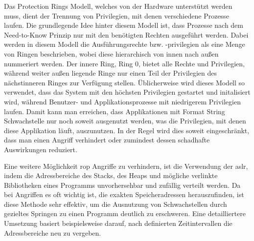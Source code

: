 \documentclass[a4paper,
DIV=13,
12pt,
BCOR=10mm,
department=FakIM,
oneside,
parskip=half,
automark,
listof=totocnumbered,
bibliography=totocnumbered,
acronym=totocnumbered
] {OTHRartcl}
\begin{document}
Das Protection Rings Modell, welches von der Hardware unterstützt werden muss, dient der Trennung von Privilegien, mit denen verschiedene Prozesse laufen.
Die grundlegende Idee hinter diesem Modell ist, dass Prozesse nach dem Need-to-Know Prinzip nur mit den benötigten Rechten ausgeführt werden.
Dabei werden in diesem Modell die Ausführungsrechte bzw. -privilegien
als eine Menge von Ringen beschrieben, wobei diese hierarchisch von innen nach außen nummeriert werden.
Der innere Ring, Ring 0, bietet alle Rechte und Privilegien, während weiter außen liegende Ringe nur einen Teil der Privilegien des nächstinneren Ringes zur Verfügung stellen.
Üblicherweise wird dieses Modell so verwendet, dass das System mit den höchsten Privilegien gestartet und initalisiert wird, während Benutzer- und Applikationsprozesse mit niedrigerem Privilegien
laufen. Damit kann man erreichen, dass Applikationen mit Format String Schwachstelle nur noch soweit ausgenutzt werden, was die Privilegien, mit denen diese Applikation läuft, auszunutzen.
In der Regel wird dies soweit eingeschränkt, dass man einen Angriff verhindert oder zumindest dessen schadhafte Auswirkungen reduziert.

Eine weitere Möglichkeit \ac{rop} Angriffe zu verhindern, ist die Verwendung der \ac{aslr}, indem die Adressbereiche des Stacks, des Heaps und mögliche verlinkte Bibliotheken eines Programms unvorhersehbar und zufällig verteilt werden.
Da bei Angriffen es oft wichtig ist, die exakten Speicheradressen herauszufinden, ist diese Methode sehr effektiv, um die Ausnutzung von Schwachstellen durch gezieltes Springen zu einen Programm deutlich zu erschweren.
Eine detailliertere Umsetzung basiert beispielsweise darauf, nach definierten Zeitintervallen die Adressbereiche neu zu vergeben. \cite{OWASP Buffer Overflow} \cite{OWASP Buffer Overflow Attack}
\end{document}
